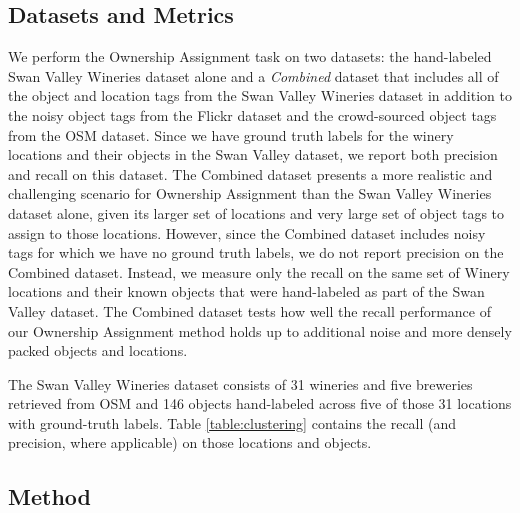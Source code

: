 \subsection{Datasets and Metrics}

We perform the Ownership Assignment task on two datasets: the hand-labeled Swan Valley Wineries dataset alone and a \textit{Combined} dataset that includes all of the object and location tags from the Swan Valley Wineries dataset in addition to the noisy object tags from the Flickr dataset and the crowd-sourced object tags from the OSM dataset. 
Since we have ground truth labels for the winery locations and their objects in the Swan Valley dataset, we report both precision and recall on this dataset.
The Combined dataset presents a more realistic and challenging scenario for Ownership Assignment than the Swan Valley Wineries dataset alone, given its larger set of locations and very large set of object tags to assign to those locations. However, since the Combined dataset includes noisy tags for which we have no ground truth labels, we do not report precision on the Combined dataset. Instead, we measure only the recall on the same set of Winery locations and their known objects that were hand-labeled as part of the Swan Valley dataset. The Combined dataset tests how well the recall performance of our Ownership Assignment method holds up to additional noise and more densely packed objects and locations.

The Swan Valley Wineries dataset consists of 31 wineries and five breweries retrieved from OSM and 146 objects hand-labeled across five of those 31 locations with ground-truth labels. Table \ref{table:clustering} contains the recall (and precision, where applicable) on those locations and objects.


\subsection{Method}


